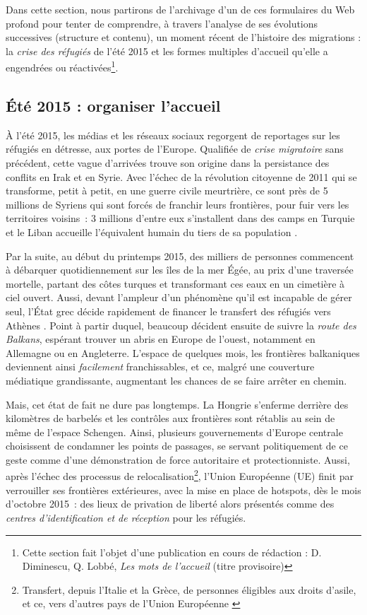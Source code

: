 \documentclass[symmetric,justified,marginals=raggedouter]{tufte-book}
\begin{document}
Dans cette section, nous partirons de l'archivage d'un de ces formulaires du Web profond pour tenter de comprendre, à travers l'analyse de ses évolutions successives (structure et contenu), un moment récent de l'histoire des migrations : la \textit{crise des réfugiés} de l'été 2015 et les formes multiples d'accueil qu'elle a engendrées ou réactivées\footnote{\RaggedOuter Cette section fait l'objet d'une publication en cours de rédaction : D. Diminescu, Q. Lobbé, \textit{Les mots de l'accueil} (titre provisoire)}.

\subsection{Été 2015 : organiser l'accueil}

\noindent À l'été 2015, les médias et les réseaux sociaux regorgent de reportages sur les réfugiés en détresse, aux portes de l’Europe. Qualifiée de \textit{crise migratoire} sans précédent, cette vague d'arrivées trouve son origine dans la persistance des conflits en Irak et en Syrie. Avec l'échec de la révolution citoyenne de 2011 qui se transforme, petit à petit, en une guerre civile meurtrière, ce sont près de 5 millions de Syriens qui sont forcés de franchir leurs frontières, pour fuir vers les territoires voisins~: 3 millions d'entre eux s'installent dans des camps en Turquie et le Liban accueille l'équivalent humain du tiers de sa population \citep{blanchard_crise_2016}.   

Par la suite, au début du printemps 2015, des milliers de personnes commencent à débarquer quotidiennement sur les îles de la mer Égée, au prix d'une traversée mortelle, partant des côtes turques et transformant ces eaux en un cimetière à ciel ouvert. Aussi, devant l'ampleur d'un phénomène qu'il est incapable de gérer seul, l'État grec décide rapidement de financer le transfert des réfugiés vers Athènes \citep{pillant_en_2016}. Point à partir duquel, beaucoup décident ensuite de suivre la \textit{route des Balkans}, espérant trouver un abris en Europe de l'ouest, notamment en Allemagne ou en Angleterre. L'espace de quelques mois, les frontières balkaniques deviennent ainsi \textit{facilement} franchissables, et ce, malgré une couverture médiatique grandissante, augmentant les chances de se faire arrêter en chemin. 

Mais, cet état de fait ne dure pas longtemps. La Hongrie s'enferme derrière des kilomètres de barbelés et les contrôles aux frontières sont rétablis au sein de même de l'espace Schengen. Ainsi, plusieurs gouvernements d'Europe centrale choisissent de condamner les points de passages, se servant politiquement de ce geste comme d'une démonstration de force autoritaire et protectionniste. Aussi, après l'échec des processus de relocalisation\footnote{\RaggedOuter Transfert, depuis l'Italie et la Grèce, de personnes éligibles aux droits d'asile, et ce, vers d'autres pays de l'Union Européenne \citep{tervonen_finlande:_2016}}, l'Union Européenne (UE) finit par verrouiller ses frontières extérieures, avec la mise en place de hotspots, dès le mois d'octobre 2015~: des lieux de privation de liberté alors présentés comme des \textit{centres d'identification et de réception} pour les réfugiés.   
\end{document}
